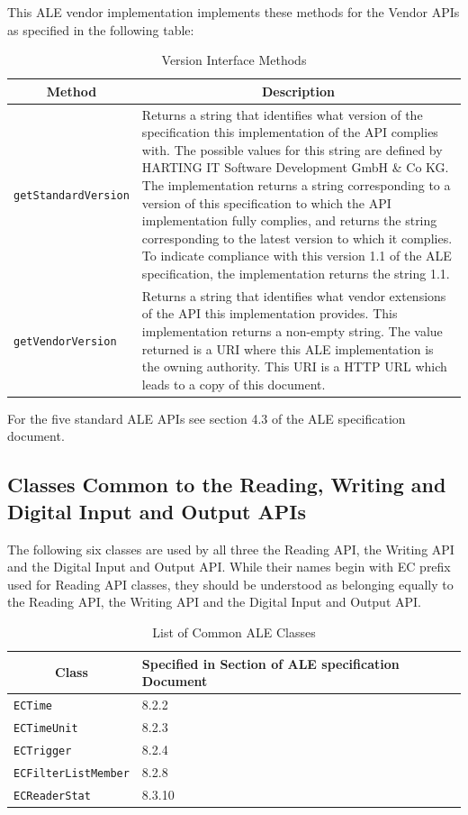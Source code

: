 \documentclass[11pt,a4paper,oneside]{article}
\begin{document}
This ALE vendor implementation implements these methods for the Vendor APIs as specified in the following table:

\begin{table}[!h]
\begin{tabularx}{\linewidth}{|l|X|}
\hline
\multicolumn{1}{|c|}{\textbf{Method}}&
\multicolumn{1}{c|}{\textbf{Description}}\\
\hline
\texttt{getStandardVersion}&Returns a string that identifies what version of the specification this implementation of the API complies with. The possible values for this string are defined by HARTING IT Software Development GmbH \& Co KG. The implementation returns a string corresponding to a version of this specification to which the API implementation fully complies, and returns the string corresponding to the latest version to which it complies. To indicate compliance with this version 1.1 of the ALE specification, the implementation returns the string 1.1.\\
\hline
\texttt{getVendorVersion} &Returns a string that identifies what vendor extensions of the API this implementation provides. This implementation returns a non-empty string. The value returned is a URI where this ALE implementation is the owning authority. This URI is a HTTP URL which leads to a copy of this document.\\
\hline
\end{tabularx}
 \caption{Version Interface Methods}
\MakeLineNo
\end{table}
\FloatBarrier

For the five standard ALE APIs see section 4.3 of the ALE specification document.

\subsection{Classes Common to the Reading, Writing and Digital Input and Output APIs}
The following six classes are used by all three the Reading API, the Writing API and the Digital Input and Output API. While their names begin with EC prefix used for Reading API classes, they should be understood as belonging equally to the Reading API, the Writing API and the Digital Input and Output API.

\begin{table}[!h]
\begin{tabularx}{\linewidth}{|l|X|}
\hline
\multicolumn{1}{|c|}{\textbf{Class}}&
\textbf{Specified in Section of ALE specification Document}\\
\hline
\texttt{ECTime}&8.2.2\\
\hline
\texttt{ECTimeUnit}&8.2.3\\
\hline
\texttt{ECTrigger}&8.2.4\\
\hline
\texttt{ECFilterListMember}&8.2.8\\
\hline
\texttt{ECReaderStat}&8.3.10\\
\hline
\end{tabularx}
\caption{List of Common ALE Classes}
\MakeLineNo
\end{table}
\FloatBarrier
\end{document}
